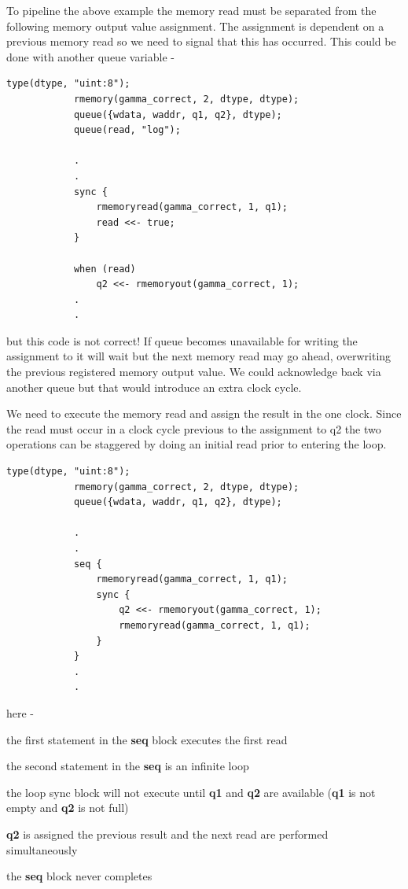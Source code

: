         To pipeline the above example the memory read must be separated from the
        following memory output value assignment. The assignment is dependent on
        a previous memory read so we need to signal that this has occurred. This
        could be done with another queue variable -
        \begin{lstlisting}[language=threepl]
            type(dtype, "uint:8");
            rmemory(gamma_correct, 2, dtype, dtype);
            queue({wdata, waddr, q1, q2}, dtype);
            queue(read, "log");

            .
            .
            sync {
                rmemoryread(gamma_correct, 1, q1);
                read <<- true;
            }

            when (read)
                q2 <<- rmemoryout(gamma_correct, 1);
            .
            .
        \end{lstlisting}
        but this code is not correct! If queue  becomes unavailable for
        writing the assignment to it will wait but the next memory read may go
        ahead, overwriting the previous registered memory output value. We could
        acknowledge back via another queue but that would introduce an extra clock
        cycle.

        We need to execute the memory read and assign the result in the one clock.
        Since the read must occur in a clock cycle previous to the assignment to q2
        the two operations can be staggered by doing an initial read prior to
        entering the loop.
        \pagebreak
        \begin{lstlisting}[language=threepl]
            type(dtype, "uint:8");
            rmemory(gamma_correct, 2, dtype, dtype);
            queue({wdata, waddr, q1, q2}, dtype);

            .
            .
            seq {
                rmemoryread(gamma_correct, 1, q1);
                sync {
                    q2 <<- rmemoryout(gamma_correct, 1);
                    rmemoryread(gamma_correct, 1, q1);
                }
            }
            .
            .
        \end{lstlisting}
        here -
        \blist
        \item   the first statement in the {\bf seq} block executes the first read
        \item   the second statement in the {\bf seq} is an infinite loop
        \item   the loop sync block will not execute until {\bf q1} and {\bf q2} are
                available ({\bf q1} is not empty and {\bf q2} is not full)
        \item   {\bf q2} is assigned the previous result and the next read are performed
                simultaneously
        \item   the {\bf seq} block never completes
        \blend

